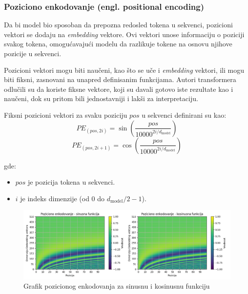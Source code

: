 \documentclass[12pt]{article}
\begin{document}
   \newpage

   \subsubsection*{Poziciono enkodovanje (engl. positional encoding)}
   Da bi model bio sposoban da prepozna redosled tokena u sekvenci, pozicioni vektori 
   se dodaju na \textit{embedding} vektore. Ovi vektori unose informaciju o poziciji 
   svakog tokena, omogućavajući modelu da razlikuje tokene na osnovu njihove pozicije 
   u sekvenci.

   Pozicioni vektori mogu biti naučeni, kao što se uče i \textit{embedding} vektori, ili mogu biti fiksni, 
   zasnovani na unapred definisanim funkcijama. Autori transformera odlučili su da 
   koriste fiksne vektore, koji su davali gotovo iste rezultate kao i naučeni, 
   dok su pritom bili jednostavniji i lakši za interpretaciju.

   Fiksni pozicioni vektori za svaku poziciju \( pos \) u sekvenci definirani su kao:
   \[
      PE_{(pos, 2i)} = \sin\left(\frac{pos}{10000^{2i/d_{\text{model}}}}\right)
   \]
   \vspace{-0.5cm}
   \[
         PE_{(pos, 2i+1)} = \cos\left(\frac{pos}{10000^{2i/d_{\text{model}}}}\right)
   \]
         
   gde:
   \begin{itemize}
      \vspace{-0.5cm}
      \item \( pos \) je pozicija tokena u sekvenci.
      \item \( i \) je indeks dimenzije (od 0 do \( d_{\text{model}}/2 - 1 \)).
   \end{itemize}

   \begin{figure}[h!]
      \hspace{-2cm} %
      \includegraphics[width=1.3\textwidth]{pos_encoding.png}
      \caption{Grafik pozicionog enkodovanja za sinusnu i kosinusnu funkciju}
      \label{fig:pos_encoding}
   \end{figure}
\end{document}
